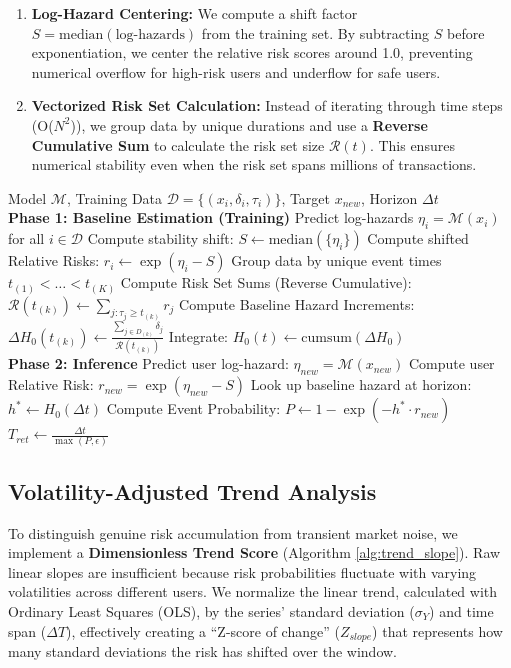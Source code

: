 \documentclass[manuscript,screen,review]{acmart}
\begin{document}
\begin{enumerate}
    \item \textbf{Log-Hazard Centering:} We compute a shift factor $S = \text{median}(\text{log-hazards})$ from the training set. By subtracting $S$ before exponentiation, we center the relative risk scores around 1.0, preventing numerical overflow for high-risk users and underflow for safe users.
    \item \textbf{Vectorized Risk Set Calculation:} Instead of iterating through time steps (O($N^2$)), we group data by unique durations and use a \textbf{Reverse Cumulative Sum} to calculate the risk set size $\mathcal{R}(t)$. This ensures numerical stability even when the risk set spans millions of transactions.
\end{enumerate}


\begin{algorithm}[tbh]
\caption{Stable Return Period Estimation}
\label{alg:return_period}
\begin{algorithmic}[1]
\REQUIRE Model $\mathcal{M}$, Training Data $\mathcal{D}=\{(x_i, \delta_i, \tau_i)\}$, Target $x_{new}$, Horizon $\Delta t$
\\ \textbf{Phase 1: Baseline Estimation (Training)}
\STATE Predict log-hazards $\eta_i = \mathcal{M}(x_i)$ for all $i \in \mathcal{D}$
\STATE Compute stability shift: $S \leftarrow \text{median}(\{\eta_i\})$
\STATE Compute shifted Relative Risks: $r_i \leftarrow \exp(\eta_i - S)$
\STATE Group data by unique event times $t_{(1)} < \dots < t_{(K)}$
\STATE Compute Risk Set Sums (Reverse Cumulative):
\\ \quad $\mathcal{R}(t_{(k)}) \leftarrow \sum_{j: \tau_j \ge t_{(k)}} r_j$
\STATE Compute Baseline Hazard Increments:
\\ \quad $\Delta H_0(t_{(k)}) \leftarrow \frac{\sum_{j \in D_{(k)}} \delta_j}{\mathcal{R}(t_{(k)})}$
\STATE Integrate: $H_0(t) \leftarrow \text{cumsum}(\Delta H_0)$
\\ \textbf{Phase 2: Inference}
\STATE Predict user log-hazard: $\eta_{new} = \mathcal{M}(x_{new})$
\STATE Compute user Relative Risk: $r_{new} = \exp(\eta_{new} - S)$
\STATE Look up baseline hazard at horizon: $h^* \leftarrow H_0(\Delta t)$
\STATE Compute Event Probability: $P \leftarrow 1 - \exp(-h^* \cdot r_{new})$
\RETURN $T_{ret} \leftarrow \frac{\Delta t}{\max(P, \epsilon)}$
\end{algorithmic}
\end{algorithm}

\subsection{Volatility-Adjusted Trend Analysis}
\label{sec:trend_analysis}
To distinguish genuine risk accumulation from transient market noise, we implement a \textbf{Dimensionless Trend Score} (Algorithm \ref{alg:trend_slope}). Raw linear slopes are insufficient because risk probabilities fluctuate with varying volatilities across different users. We normalize the linear trend, calculated with Ordinary Least Squares (OLS), by the series' standard deviation ($\sigma_Y$) and time span ($\Delta T$), effectively creating a ``Z-score of change'' ($Z_{slope}$) that represents how many standard deviations the risk has shifted over the window.
\end{document}

